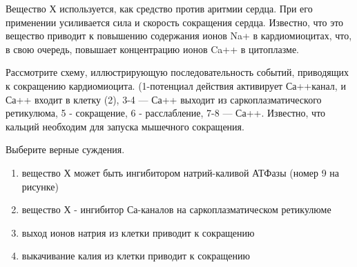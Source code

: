 
Вещество Х используется,
как средство против аритмии сердца. При его применении усиливается сила и
скорость сокращения сердца. Известно, что это вещество приводит к повышению содержания ионов Na+ в кардиомиоцитах, что, в свою очередь, повышает
концентрацию ионов Ca++ в цитоплазме.


Рассмотрите схему,
иллюстрирующую последовательность событий, приводящих к сокращению
кардиомиоцита. (1-потенциал действия активирует Са++канал, и Са++ входит в
клетку (2), 3-4 — Са++ выходит из саркоплазматического ретикулюма, 5 -
сокращение, 6 - расслабление, 7-8 — Са++. Известно, что кальций необходим для
запуска мышечного сокращения.

Выберите верные суждения.  

\begin{enumerate}
    \item вещество Х может быть ингибитором натрий-каливой АТФазы (номер 9 на рисунке)
    \item вещество Х - ингибитор Са-каналов на саркоплазматическом ретикулюме
    \item выход ионов натрия из клетки приводит к сокращению
    \item выкачивание калия из клетки приводит к сокращению
\end{enumerate}

